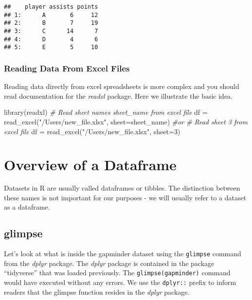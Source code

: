 \documentclass[
]{book}
\newenvironment{Shaded}{\begin{snugshade}}{\end{snugshade}}
\newcommand{\AttributeTok}[1]{\textcolor[rgb]{0.77,0.63,0.00}{#1}}
\newcommand{\CommentTok}[1]{\textcolor[rgb]{0.56,0.35,0.01}{\textit{#1}}}
\newcommand{\DecValTok}[1]{\textcolor[rgb]{0.00,0.00,0.81}{#1}}
\newcommand{\FunctionTok}[1]{\textcolor[rgb]{0.00,0.00,0.00}{#1}}
\newcommand{\NormalTok}[1]{#1}
\newcommand{\OtherTok}[1]{\textcolor[rgb]{0.56,0.35,0.01}{#1}}
\newcommand{\StringTok}[1]{\textcolor[rgb]{0.31,0.60,0.02}{#1}}
\begin{document}
\begin{verbatim}
##    player assists points
## 1:      A       6     12
## 2:      B       7     19
## 3:      C      14      7
## 4:      D       4      6
## 5:      E       5     10
\end{verbatim}

\hypertarget{reading-data-from-excel-files}{%
\subsection{Reading Data From Excel Files}\label{reading-data-from-excel-files}}

Reading data directly from excel spreadsheets is more complex and you should read documentation for the \emph{readxl} package. Here we illustrate the basic idea.

\begin{Shaded}
\begin{Highlighting}[]
\FunctionTok{library}\NormalTok{(readxl)}
\CommentTok{\# Read sheet names \textquotesingle{}sheet\_name\textquotesingle{} from excel file}
\NormalTok{df }\OtherTok{=} \FunctionTok{read\_excel}\NormalTok{(}\StringTok{"/Users/new\_file.xlsx"}\NormalTok{, }\AttributeTok{sheet=}\StringTok{\textquotesingle{}sheet\_name\textquotesingle{}}\NormalTok{)}
\CommentTok{\#or}
\CommentTok{\# Read sheet 3 from excel file}
\NormalTok{df }\OtherTok{=} \FunctionTok{read\_excel}\NormalTok{(}\StringTok{"/Users/new\_file.xlsx"}\NormalTok{, }\AttributeTok{sheet=}\DecValTok{3}\NormalTok{)}
\end{Highlighting}
\end{Shaded}

\hypertarget{OverviewDataframe}{%
\chapter{Overview of a Dataframe}\label{OverviewDataframe}}

Datasets in R are usually called dataframes or tibbles. The distinction between these names is not important for our purposes - we will usually refer to a dataset as a dataframe.

\hypertarget{glimpse}{%
\section{glimpse}\label{glimpse}}

Let's look at what is inside the gapminder dataset using the \texttt{glimpse} command from the \emph{dplyr} package. The \emph{dplyr} package is contained in the package ``tidyverse'' that was loaded previously. The \texttt{glimpse(gapminder)} command would have executed without any errors. We use the \texttt{dplyr::} prefix to inform readers that the glimpse function resides in the \emph{dplyr} package.
\end{document}
